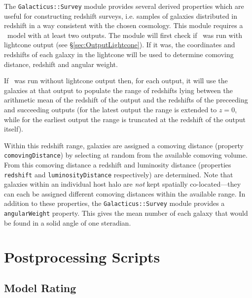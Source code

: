 The {\tt Galacticus::Survey} module provides several derived properties which are useful for constructing redshift surveys, i.e. samples of galaxies distributed in redshift in a way consistent with the chosen cosmology. This module requires a \glc\ model with at least two outputs. The module will first check if \glc\ was run with lightcone output (see \S\ref{sec:OutputLightcone}). If it was, the coordinates and redshifts of each galaxy in the lightcone will be used to determine comoving distance, redshift and angular weight.

If \glc\ was run without lightcone output then, for each output, it will use the galaxies at that output to populate the range of redshifts lying between the arithmetic mean of the redshift of the output and the redshifts of the preceeding and succeeding outputs (for the latest output the range is extended to $z=0$, while for the earliest output the range is truncated at the redshift of the output itself).

Within this redshift range, galaxies are assigned a comoving distance (property {\tt comovingDistance}) by selecting at random from the available comoving volume. From this comoving distance a redshift and luminosity distance (properties {\tt redshift} and {\tt luminosityDistance} respectively) are determined. Note that galaxies within an individual host halo are \emph{not} kept spatially co-located---they can each be assigned different comoving distances within the available range. In addition to these properties, the {\tt Galacticus::Survey} module provides a {\tt angularWeight} property. This gives the mean number of each galaxy that would be found in a solid angle of one steradian.

\section{Postprocessing Scripts}\label{sec:PostProcessingScripts}

\subsection{Model Rating}\label{sec:ModelRating}

